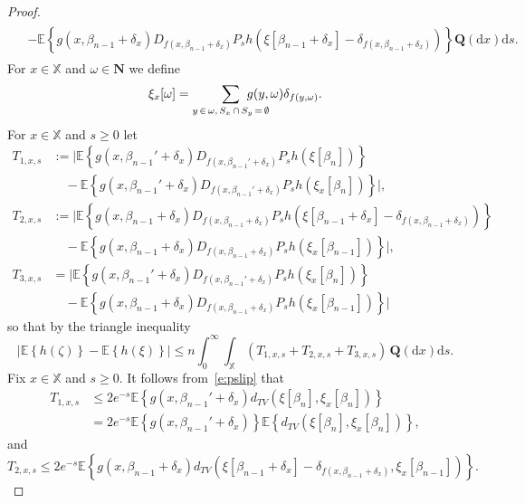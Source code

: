 \documentclass[AHL,Unicode,longabstracts]{cedram}
\newcommand*\bN{\mathbf{N}}
\newcommand{\bQ}{\mathbf{Q}}
\newcommand*\X{\mathbb{X}}
\newcommand{\E}{\mathbb{E}}
\newcommand*\md{\mathrm{d}}
\newcommand{\mean}[1] {\E\left\{{#1}\right\}}
\begin{document}
\begin{proof}
\begin{multline*}
\begin{aligned}
& - \mean{g\left(x,\beta_{n-1}+\delta_x\right) D_{f\left(x,\beta_{n-1}+\delta_x\right)}P_sh\left(\xi\left[\beta_{n-1}+\delta_x\right]-\delta_{f\left(x,\beta_{n-1}+\delta_x\right)}\right)} \bQ(\md x) \md s.
\end{aligned}
\end{multline*}
For $x\in\X$ and $\omega\in\bN$ we define
\[
\xi_{x}[\omega]= \sum_{y\,\in\,\omega,\,S_x\,\cap \,S_y\,=\,\emptyset}\mkern-35mu g(y,\omega) \delta_{f(y,\omega)}.
\]
For $x\in\X$ and $s\geq 0$ let
\begin{align*}
T_{1,x,s} & := \big| \mean{g\left(x,\beta_{n-1}'+\delta_x\right) D_{f\left(x,\beta_{n-1}'+\delta_x\right)}P_sh\left(\xi\left[\beta_n\right]\right) } \\
& \quad - \mean{g\left(x,\beta_{n-1}'+\delta_x\right) D_{f\left(x,\beta_{n-1}'+\delta_x\right)}P_sh\left(\xi_x\left[\beta_{n}\right]\right)} \big|, \\
T_{2,x,s} & := \big|\mean{g\left(x,\beta_{n-1}+\delta_x\right) D_{f\left(x,\beta_{n-1}+\delta_x\right)}P_sh\left(\xi\left[\beta_{n-1}+\delta_x\right] -\delta_{f\left(x,\beta_{n-1}+\delta_x\right)}\right) } \\
& \quad - \mean{g\left(x,\beta_{n-1}+\delta_x\right) D_{f\left(x,\beta_{n-1}+\delta_x\right)}P_sh\left(\xi_x\left[\beta_{n-1}\right]\right) } \big|, \\
T_{3,x,s} & = \big| \mean{g\left(x,\beta_{n-1}'+\delta_x\right) D_{f\left(x,\beta_{n-1}'+\delta_x\right)}P_sh\left(\xi_x\left[\beta_{n}\right]\right) } \\
& \quad- \mean{g\left(x,\beta_{n-1}+\delta_x\right) D_{f\left(x,\beta_{n-1}+\delta_x\right)}P_sh\left(\xi_x\left[\beta_{n-1}\right]\right)} \big|
\end{align*}
so that by the triangle inequality
\begin{equation}\label{e:InequalityTs}
\big| \mean{h(\zeta)} - \mean{h(\xi)} \big| \leq n \int_0^\infty \int_{\X} \left(T_{1,x,s} + T_{2,x,s} + T_{3,x,s} \right) \, \bQ(\md x) \md s.
\end{equation}
Fix $x\in\X$ and $s\geq 0$. It follows from~\eqref{e:pslip} that
\begin{align*}
T_{1,x,s} & \leq 2e^{-s} \mean{ g\left(x,\beta_{n-1}'+\delta_x\right) d_{TV}\left(\xi[\beta_n],\xi_x[\beta_{n}]\right) } \\
& = 2e^{-s} \mean{ g\left(x,\beta_{n-1}'+\delta_x\right)} \mean{d_{TV}\left(\xi[\beta_n],\xi_x[\beta_{n}]\right) },
\end{align*}
and
\[
T_{2,x,s} \leq 2e^{-s} \mean{ g\left(x,\beta_{n-1}+\delta_x\right) d_{TV}\left(\xi\left[\beta_{n-1}+\delta_x\right] -\delta_{f\left(x,\beta_{n-1}+\delta_x\right)},\xi_x\left[\beta_{n-1}\right]\right)}.
\]
\end{proof}
\end{document}
